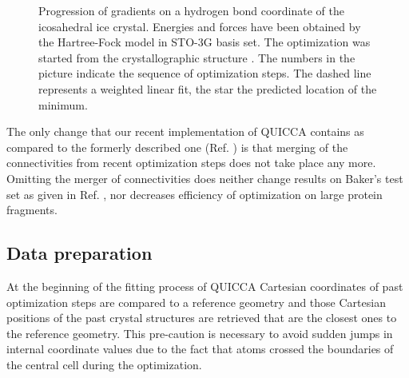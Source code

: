 \documentclass[prl,aps,preprint,superbib,12pt]{revtex4}
\begin{document}
\begin{figure}[h]
\caption{
Progression of gradients on a hydrogen bond coordinate
of the icosahedral ice crystal.
Energies and forces have been obtained by the Hartree-Fock
model in STO-3G basis set.
The optimization was started from the crystallographic structure
\cite{AGoto90}.
The numbers in the picture
indicate the sequence of optimization steps. The dashed line represents
a weighted linear fit, the star the predicted location of the minimum.}
\label{iceIh}
\end{figure}

The only change that our recent implementation of QUICCA contains as 
compared to the formerly described one (Ref. )
is that merging of the connectivities from recent optimization steps
does not take place any more. Omitting the merger of connectivities
does neither change results on Baker's test set as given 
in Ref. , nor decreases efficiency of optimization
on large protein fragments.

\subsection{Data preparation}
At the beginning of the fitting process of QUICCA
Cartesian coordinates of past optimization steps are compared to a
reference geometry and those Cartesian positions of the past 
crystal structures are retrieved that are the closest ones
to the reference geometry. This pre-caution is necessary
to avoid sudden jumps in internal coordinate values due to the
fact that atoms crossed the boundaries of the central cell during 
the optimization.
\end{document}
